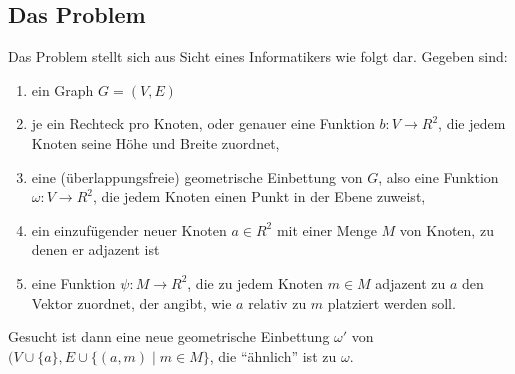 \subsection{Das Problem}
\label{sub:problem}

Das Problem stellt sich aus Sicht eines Informatikers wie folgt dar. Gegeben sind:

\begin{enumerate}
  \item ein Graph $G = (V, E)$
  \item je ein Rechteck pro Knoten, oder genauer eine Funktion $b: V \rightarrow R^2$, die jedem Knoten seine Höhe und Breite zuordnet,
  \item eine (überlappungsfreie) geometrische Einbettung von $G$, also eine Funktion $\omega: V \rightarrow R^2$, die jedem Knoten einen Punkt in der Ebene zuweist,
  \item ein einzufügender neuer Knoten $a \in R^2$ mit einer Menge $M$ von Knoten, zu denen er adjazent ist
  \item eine Funktion $\psi: M \rightarrow R^2$, die zu jedem Knoten $m \in M$ adjazent zu $a$ den Vektor zuordnet, der angibt, wie $a$ relativ zu $m$ platziert werden soll.
\end{enumerate}

Gesucht ist dann eine neue geometrische Einbettung $\omega'$ von $(V \cup \{a\}, E \cup \{(a,m) \mid m \in M\}$, die "`ähnlich"' ist zu $\omega$.


